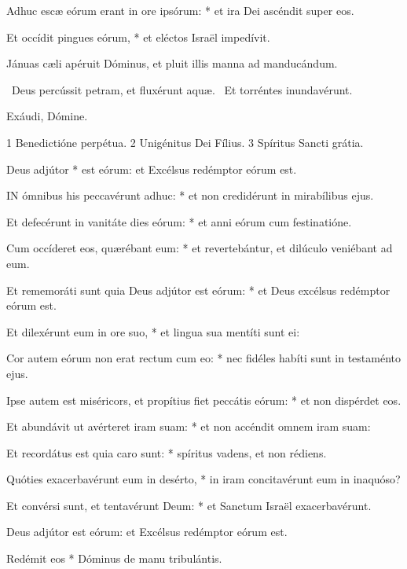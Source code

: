 Adhuc escæ eórum erant in ore ipsórum: * et ira Dei ascéndit super eos.

Et occídit pingues eórum, * et eléctos Israël impedívit.

 Jánuas cæli apéruit Dóminus, et pluit illis manna ad manducándum.


\V\ Deus percússit petram, et fluxérunt aquæ. \R\ Et torréntes inundavérunt.

 Exáudi, Dómine.

 1 Benedictióne perpétua. 2 Unigénitus Dei Fílius. 3 Spíritus Sancti grátia.


 Deus adjútor * est eórum: et Excélsus redémptor eórum est.


\lettrine[lines=2]{I}{N} ómnibus his peccavérunt adhuc: * et non credidérunt in mirabílibus ejus.

Et defecérunt in vanitáte dies eórum: * et anni eórum cum festinatióne.

Cum occíderet eos, quærébant eum: * et revertebántur, et dilúculo veniébant ad eum.

Et rememoráti sunt quia Deus adjútor est eórum: * et Deus excélsus redémptor eórum est.

Et dilexérunt eum in ore suo, * et lingua sua mentíti sunt ei:

Cor autem eórum non erat rectum cum eo: * nec fidéles habíti sunt in testaménto ejus.

Ipse autem est miséricors, et propítius fiet peccátis eórum: * et non dispérdet eos.

Et abundávit ut avérteret iram suam: * et non accéndit omnem iram suam:

Et recordátus est quia caro sunt: * spíritus vadens, et non rédiens.

Quóties exacerbavérunt eum in desérto, * in iram concitavérunt eum in inaquóso?

Et convérsi sunt, et tentavérunt Deum: * et Sanctum Israël exacerbavérunt.

 Deus adjútor est eórum: et Excélsus redémptor eórum est.

 Redémit eos * Dóminus de manu tribulántis.


